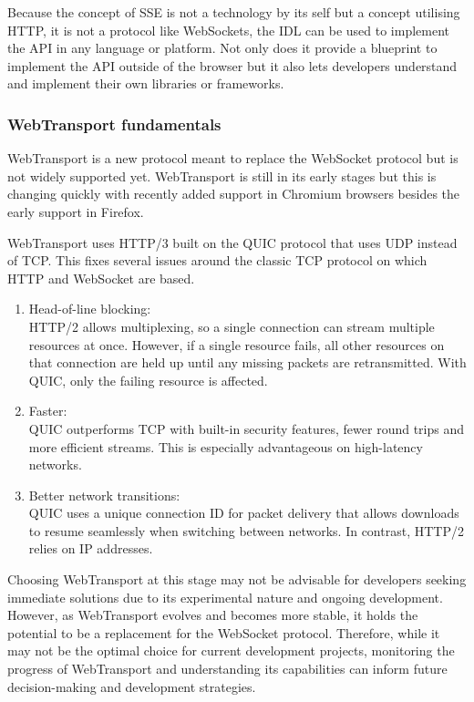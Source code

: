 Because the concept of SSE is not a technology by its self but a concept utilising HTTP, it is not a protocol like WebSockets, the IDL can be used to implement the API in any language or platform. Not only does it provide a blueprint to implement the API outside of the browser but it also lets developers understand and implement their own libraries or frameworks.

\subsubsection{WebTransport fundamentals}

WebTransport is a new protocol meant to replace the WebSocket protocol but is not widely supported yet. WebTransport is still in its early stages but this is changing quickly with recently added support in Chromium browsers besides the early support in Firefox.

WebTransport uses HTTP/3 built on the QUIC protocol that uses UDP instead of TCP. This fixes several issues around the classic TCP protocol on which HTTP and WebSocket are based. \cite{w3-wt}

\begin{enumerate}
  \item Head-of-line blocking: \\ HTTP/2 allows multiplexing, so a single connection can stream multiple resources at once. However, if a single resource fails, all other resources on that connection are held up until any missing packets are retransmitted. With QUIC, only the failing resource is affected.
  \item Faster: \\ QUIC outperforms TCP with built-in security features, fewer round trips and more efficient streams. This is especially advantageous on high-latency networks.
  \item Better network transitions: \\ QUIC uses a unique connection ID for packet delivery that allows downloads to resume seamlessly when switching between networks. In contrast, HTTP/2 relies on IP addresses.
\end{enumerate}

Choosing WebTransport at this stage may not be advisable for developers seeking immediate solutions due to its experimental nature and ongoing development. However, as WebTransport evolves and becomes more stable, it holds the potential to be a replacement for the WebSocket protocol. Therefore, while it may not be the optimal choice for current development projects, monitoring the progress of WebTransport and understanding its capabilities can inform future decision-making and development strategies.

